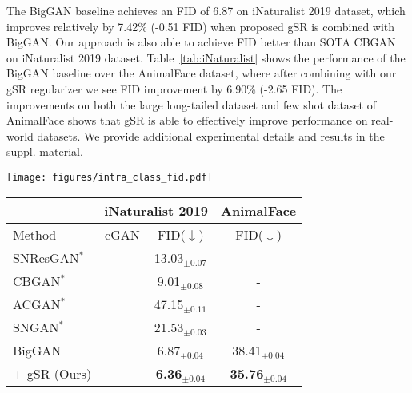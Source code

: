 \documentclass[runningheads,table]{llncs}
\newcommand{\cmark}{\color{green}{\ding{51}}}\newcommand{\xmark}{\color{red}{\ding{55}}}\newcommand{\etal}{\textit{et al}.}
\begin{document}
The BigGAN baseline achieves an FID of 6.87 on iNaturalist 2019 dataset, which improves relatively by 7.42\% (-0.51 FID) when proposed gSR is combined with BigGAN. Our approach is also able to achieve FID better than SOTA CBGAN on iNaturalist 2019 dataset.
\mbox{Table~\ref{tab:iNaturalist}} shows the performance of the BigGAN baseline over the AnimalFace dataset, where after combining with our gSR regularizer we see FID improvement by 6.90\% (-2.65 FID). The improvements on both the large long-tailed dataset and few shot dataset of AnimalFace shows that gSR is able to effectively improve performance on real-world datasets. We provide additional experimental details and results in the suppl. material.
\setlength{\intextsep}{0pt}\begin{figure*}[t]
  \centering
\begin{minipage}[c]{0.34\linewidth}
    \centering
    \texttt{[image: figures/intra\_class\_fid.pdf]}
    \label{fig:intra-fid}
  \end{minipage}
   \hfill
  \begin{minipage}[c]{0.60\textwidth}
    \centering
    \label{tab:iNaturalist}
    \begin{tabular}{l|c|c|c}
    \toprule
                & \multicolumn{2}{c}{iNaturalist 2019} & AnimalFace \\ \hline
         Method & cGAN & FID($\downarrow$) & FID($\downarrow$)\\ \midrule
         SNResGAN$^*$~\cite{miyato2018spectral}& \xmark & 13.03$_{\pm0.07}$ & -\\
         CBGAN$^*$~\cite{rangwani2021class} & \xmark & 9.01$_{\pm0.08}$ & - \\ 
         ACGAN$^*$~\cite{odena2017conditional} & \cmark & 47.15$_{\pm0.11}$ & - \\
         SNGAN$^*$~\cite{miyato2018cgans} & \cmark & 
         21.53$_{\pm0.03}$ & -\\  \midrule
         
         BigGAN~\cite{brock2018large} & \cmark & 6.87$_{\pm0.04}$ & 38.41$_{\pm0.04}$\\
        \rowcolor{gray!10} \; + gSR (Ours) & \cmark&\textbf{6.36$_{\pm0.04}$} & \textbf{35.76$_{\pm0.04}$} \\ \bottomrule
    \end{tabular}
  \end{minipage}
\end{figure*}
\end{document}
